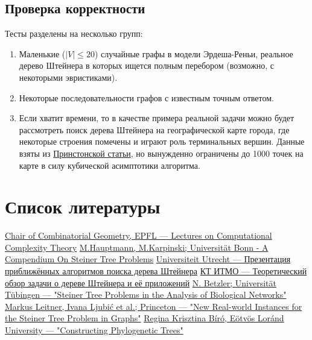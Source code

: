 \documentclass[11pt,a4paper]{report}
\def\le{\leqslant}
\theoremstyle{definition}
\theoremstyle{definition}
\theoremstyle{definition}
\begin{document}
	\subsection{Проверка корректности}
		Тесты разделены на несколько групп:
		\begin{enumerate}
			\item Маленькие ($|V| \le 20$) случайные графы в модели Эрдеша-Реньи, реальное дерево Штейнера в которых ищется полным перебором (возможно, с некоторыми эвристиками).
			\item Некоторые последовательности графов с известным точным ответом.
			\item Если хватит времени, то в качестве примера реальной задачи можно будет рассмотреть поиск дерева Штейнера на географической карте города, где некоторые строения помечены и играют роль терминальных вершин. Данные взяты из \href{https://homepage.univie.ac.at/ivana.ljubic/research/STP/}{Принстонской статьи}, но вынужденно ограничены до 1000 точек на карте в силу кубической асимптотики алгоритма.
		\end{enumerate}
	\section{Список литературы}
	\renewcommand\bibname{}
	\patchcmd{\thebibliography}{\chapter*}{\section*}{}{}
	\vspace*{-1cm}
	\begin{thebibliography}{}
		 \href{https://dcg.epfl.ch/wp-content/uploads/2018/10/9-NPHardness.pdf}{Chair of Combinatorial Geometry, EPFL — Lectures on Computational Complexity Theory}
		 \href{http://theory.cs.uni-bonn.de/info5/steinerkompendium/netcompendium.pdf}{M.Hauptmann, M.Karpinski; Universität Bonn - A Compendium On Steiner Tree Problems}
		 \href{http://www.cs.uu.nl/docs/vakken/an/teoud/an-steiner.ppt}{Universiteit Utrecht — Презентация приближённых алгоритмов поиска дерева Штейнера}
		\href{http://rain.ifmo.ru/cat/data/theory/unsorted/steiner-problem-2010/article.pdf}{КТ ИТМО — Теоретический обзор задачи о дереве Штейнера и её приложений}
		 \href{https://fpt.akt.tu-berlin.de/publications/steiner-tree-betzler06.pdf}{N. Betzler; Universität Tübingen — "Steiner Tree Problems in the Analysis of Biological Networks"}
		 \href{https://homepage.univie.ac.at/ivana.ljubic/research/STP/realworld-stp-report-short.pdf}{Markus Leitner, Ivana Ljubić et al.; Princeton — "New Real-world Instances for the Steiner Tree Problem in Graphs"}
		 \href{http://web.cs.elte.hu/~berkri/Theses/Biro.pdf }{Regina Krisztina Bíró, Eötvös Loránd University — "Constructing Phylogenetic Trees"}
	\end{thebibliography}
\end{document}
